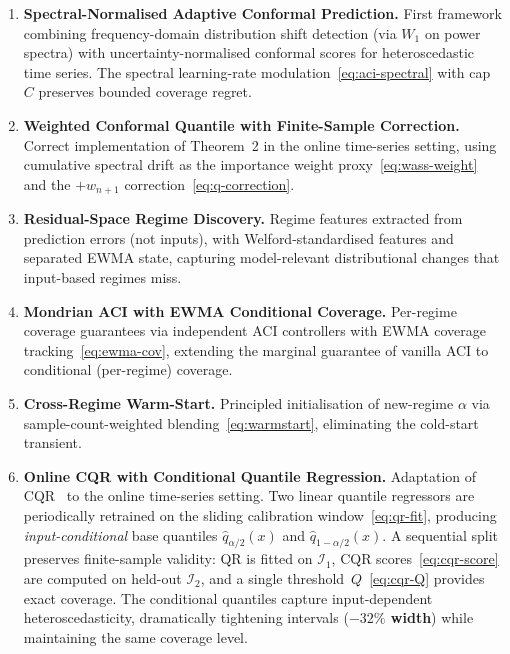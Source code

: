 \begin{enumerate}
  \item \textbf{Spectral-Normalised Adaptive Conformal Prediction.}
    First framework combining frequency-domain distribution shift
    detection (via $W_1$ on power spectra) with uncertainty-normalised
    conformal scores for heteroscedastic time series.  The spectral
    learning-rate modulation~\eqref{eq:aci-spectral} with
    cap~$C$ preserves bounded coverage regret.

  \item \textbf{Weighted Conformal Quantile with Finite-Sample
    Correction.}  Correct implementation of \citet{tibshirani2019conformal}
    Theorem~2 in the online time-series setting, using cumulative spectral
    drift as the importance weight proxy~\eqref{eq:wass-weight} and the
    $+w_{n+1}$ correction~\eqref{eq:q-correction}.

  \item \textbf{Residual-Space Regime Discovery.}  Regime features
    extracted from prediction errors (not inputs), with Welford-standardised
    features and separated EWMA state, capturing model-relevant
    distributional changes that input-based regimes miss.

  \item \textbf{Mondrian ACI with EWMA Conditional Coverage.}  Per-regime
    coverage guarantees via independent ACI controllers with EWMA coverage
    tracking~\eqref{eq:ewma-cov}, extending the marginal guarantee of
    vanilla ACI to conditional (per-regime) coverage.

  \item \textbf{Cross-Regime Warm-Start.}  Principled initialisation of
    new-regime $\alpha$ via sample-count-weighted blending~\eqref{eq:warmstart},
    eliminating the cold-start transient.

  \item \textbf{Online CQR with Conditional Quantile Regression.}
    Adaptation of CQR~\citep{romano2019conformalized} to the online
    time-series setting.  Two linear quantile regressors are periodically
    retrained on the sliding calibration window~\eqref{eq:qr-fit}, producing
    \emph{input-conditional} base quantiles $\hat{q}_{\alpha/2}(x)$ and
    $\hat{q}_{1-\alpha/2}(x)$.  A sequential split preserves finite-sample
    validity: QR is fitted on $\mathcal{I}_1$, CQR
    scores~\eqref{eq:cqr-score} are computed on held-out $\mathcal{I}_2$,
    and a single threshold~$Q$~\eqref{eq:cqr-Q} provides exact coverage.
    The conditional quantiles capture input-dependent heteroscedasticity,
    dramatically tightening intervals (\textbf{$-32\%$ width}) while
    maintaining the same coverage level.
\end{enumerate}

